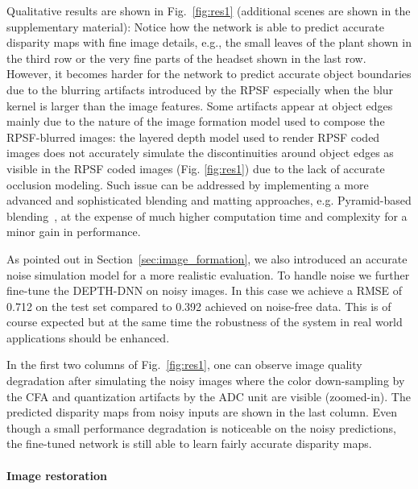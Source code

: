 \documentclass[preprint,5p,twocolumn]{elsarticle}
\begin{document}
Qualitative results are shown in Fig.~\ref{fig:res1} (additional scenes are shown in the supplementary material): Notice how the network is able to predict accurate disparity maps with fine image details, e.g., the small leaves of the plant shown in the third row or the very fine parts of the headset shown in the last row. However, it becomes harder for the network to predict accurate object boundaries due to the blurring artifacts introduced by the RPSF especially when the blur kernel is larger than the image features. Some artifacts appear at object edges mainly due to the nature of the image formation model used to compose the RPSF-blurred images: the layered depth model used to render RPSF coded images does not accurately simulate the discontinuities around object edges as visible in the RPSF coded images (Fig. \ref{fig:res1}) due to the lack of accurate occlusion modeling. Such issue can be addressed by implementing a more advanced and sophisticated blending and matting approaches, e.g. Pyramid-based blending~\cite{kraus2007depth}, at the expense of much higher computation time and complexity for a minor gain in performance.


As pointed out in Section~\ref{sec:image_formation}, we also introduced an accurate noise simulation model for  a more realistic evaluation. To handle noise we further fine-tune the DEPTH-DNN on noisy images. In this case we achieve a RMSE of 0.712 on the test set compared to 0.392 achieved on noise-free data. This is of course expected but at the same time the robustness of the system in real world applications should be enhanced.





In the first two columns of Fig.~\ref{fig:res1}, one can observe image quality degradation after simulating the noisy images where the color down-sampling by the CFA and quantization artifacts by the ADC unit are visible (zoomed-in). The predicted disparity maps from noisy inputs are shown in the last column. Even though a small performance degradation is noticeable on the noisy predictions, the fine-tuned network is still able to learn fairly accurate disparity maps. 





\paragraph{Image restoration}
\label{subsec:image_results}
\end{document}
